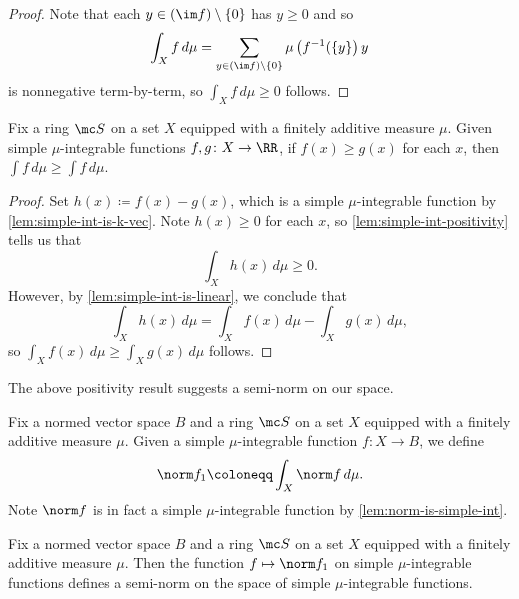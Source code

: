 \documentclass[../notes.tex]{subfiles}
\begin{document}
\begin{proof}
	Note that each $y\in(\im f)\setminus\{0\}$ has $y\ge0$ and so
	\[\int_Xf\,d\mu=\sum_{y\in(\im f)\setminus\{0\}}\mu\left(f^{-1}(\{y\}\right)y\]
	is nonnegative term-by-term, so $\int_Xf\,d\mu\ge0$ follows.
\end{proof}
\begin{cor} \label{cor:simple-bound-ints}
	Fix a ring $\mc S$ on a set $X$ equipped with a finitely additive measure $\mu$. Given simple $\mu$-integrable functions $f,g\colon X\to\RR$, if $f(x)\ge g(x)$ for each $x$, then $\int f\,d\mu\ge\int f\,d\mu$.
\end{cor}
\begin{proof}
	Set $h(x)\coloneqq f(x)-g(x)$, which is a simple $\mu$-integrable function by \autoref{lem:simple-int-is-k-vec}. Note $h(x)\ge0$ for each $x$, so \autoref{lem:simple-int-positivity} tells us that
	\[\int_Xh(x)\,d\mu\ge0.\]
	However, by \autoref{lem:simple-int-is-linear}, we conclude that
	\[\int_Xh(x)\,d\mu=\int_Xf(x)\,d\mu-\int_Xg(x)\,d\mu,\]
	so $\int_Xf(x)\,d\mu\ge\int_Xg(x)\,d\mu$ follows.
\end{proof}
The above positivity result suggests a semi-norm on our space.
\begin{notation}
	Fix a normed vector space $B$ and a ring $\mc S$ on a set $X$ equipped with a finitely additive measure $\mu$. Given a simple $\mu$-integrable function $f\colon X\to B$, we define
	\[\norm f_1\coloneqq\int_X\norm f\,d\mu.\]
	Note $\norm f$ is in fact a simple $\mu$-integrable function by \autoref{lem:norm-is-simple-int}.
\end{notation}
\begin{lemma} \label{lem:simple-l1-seminorm}
	Fix a normed vector space $B$ and a ring $\mc S$ on a set $X$ equipped with a finitely additive measure $\mu$. Then the function $f\mapsto\norm f_1$ on simple $\mu$-integrable functions defines a semi-norm on the space of simple $\mu$-integrable functions.
\end{lemma}
\end{document}
